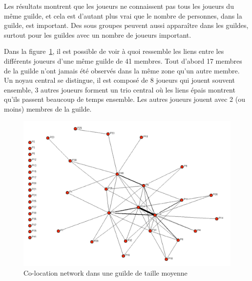 \documentclass[11pt,a4paper]{article}
\begin{document}
\par Les résultats montrent que les joueurs ne connaissent pas tous les joueurs du même guilde, et cela est d'autant plus vrai que le nombre de personnes, dans la guilde, est important. Des sous groupes peuvent aussi apparaître dans les guildes, surtout pour les guildes avec un nombre de joueurs important. 
\par Dans la figure~\ref{co-location}, il est possible de voir à quoi ressemble les liens entre les différents joueurs d'une même guilde de 41 membres. Tout d'abord 17 membres de la guilde n'ont jamais été observés dans la même zone qu'un autre membre. Un noyau central se distingue, il est composé de 8 joueurs qui jouent souvent ensemble, 3 autres joueurs forment un trio central où les liens épais montrent qu'ils passent beaucoup de temps ensemble. Les autres joueurs jouent avec 2 (ou moins) membres de la guilde.
	 \begin{figure}[!h]
        \centering
        \includegraphics[scale=0.95]{./images/co-location.png}
        \caption{Co-location network dans une guilde de taille moyenne}
        \label{co-location}
        \end{figure}

\newpage
\end{document}
